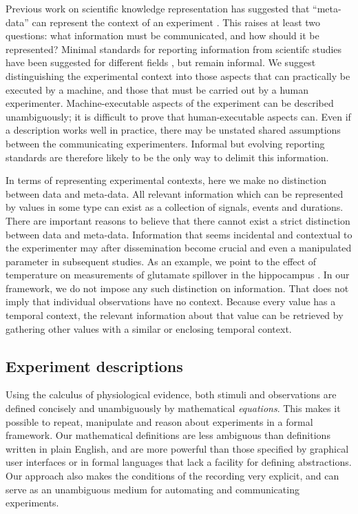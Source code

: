 Previous work on scientific knowledge representation has suggested
that ``meta-data'' can represent the context of an experiment
\citep{Bower2009}. This raises at least two questions: what
information must be communicated, and how should it be represented?
Minimal standards for reporting information from scientifc studies
have been suggested for different fields
\citep{Taylor2007,Gibson2008}, but remain informal. We suggest
distinguishing the experimental context into those aspects that can
practically be executed by a machine, and those that must be carried
out by a human experimenter. Machine-executable aspects of the
experiment can be described unambiguously; it is difficult to prove
that human-executable aspects can. Even if a description works well in
practice, there may be unstated shared assumptions between the
communicating experimenters. Informal but evolving reporting standards
are therefore likely to be the only way to delimit this information.

In terms of representing experimental contexts, here we make no
distinction between data and meta-data. All relevant information which
can be represented by values in some type can exist as a collection of
signals, events and durations. There are important reasons to believe
that there cannot exist a strict distinction between data and
meta-data. Information that seems incidental and contextual to the
experimenter may after dissemination become crucial and even a
manipulated parameter in subsequent studies. As an example, we point
to the effect of temperature on measurements of glutamate spillover in
the hippocampus \citep{Kullmann1996, Asztely1997}.  In our framework,
we do not impose any such distinction on information. That does not
imply that individual observations have no context. Because every
value has a temporal context, the relevant information about that
value can be retrieved by gathering other values with a similar or
enclosing temporal context.

\subsection*{Experiment descriptions}

Using the calculus of physiological evidence, both stimuli and
observations are defined concisely and unambiguously by mathematical
\emph{equations}. This makes it possible to repeat, manipulate and
reason about experiments in a formal framework. Our mathematical
definitions are less ambiguous than definitions written in plain
English, and are more powerful than those specified by graphical user
interfaces or in formal languages that lack a facility for defining
abstractions. Our approach also makes the conditions of the recording
very explicit, and can serve as an unambiguous medium for automating
and communicating experiments. 

